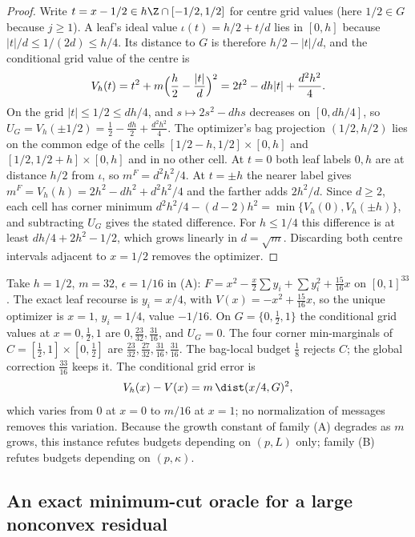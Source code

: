 \begin{proof}
Write $t=x-1/2\in h\Z\cap[-1/2,1/2]$ for centre grid values (here
$1/2\in G$ because $j\ge1$). A leaf's ideal value
$\iota(t)=h/2+t/d$ lies in $[0,h]$ because $|t|/d\le1/(2d)\le h/4$.
Its distance to $G$ is therefore $h/2-|t|/d$, and the conditional grid
value of the centre is
\[
V_h(t)=t^2+m\Bigl(\frac h2-\frac{|t|}d\Bigr)^2=2t^2-dh|t|+\frac{d^2h^2}4 .
\]
On the grid $|t|\le1/2\le dh/4$, and $s\mapsto2s^2-dhs$ decreases on
$[0,dh/4]$, so $U_G=V_h(\pm1/2)=\frac12-\frac{dh}2+\frac{d^2h^2}4$.
The optimizer's bag projection $(1/2,h/2)$ lies on the common edge of
the cells $[1/2-h,1/2]\times[0,h]$ and $[1/2,1/2+h]\times[0,h]$ and in no
other cell. At $t=0$ both leaf labels $0,h$ are at distance $h/2$ from
$\iota$, so $m^F=d^2h^2/4$. At $t=\pm h$ the nearer label gives
$m^F=V_h(h)=2h^2-dh^2+d^2h^2/4$ and the farther adds $2h^2/d$. Since
$d\ge2$, each cell has corner minimum $d^2h^2/4-(d-2)h^2
=\min\{V_h(0),V_h(\pm h)\}$, and subtracting $U_G$ gives the stated
difference. For $h\le1/4$ this difference is at least
$dh/4+2h^2-1/2$, which grows linearly in $d=\sqrt m$. Discarding both
centre intervals adjacent to $x=1/2$ removes the optimizer.
\end{proof}

\begin{example}\label{ex:cr-star32}
Take $h=1/2$, $m=32$, $\epsilon=1/16$ in (A):
$F=x^2-\frac x2\sum y_i+\sum y_i^2+\frac{15}{16}x$ on $[0,1]^{33}$.
The exact leaf recourse is $y_i=x/4$, with $V(x)=-x^2+\frac{15}{16}x$, so
the unique optimizer is $x=1$, $y_i=1/4$, value $-1/16$. On
$G=\{0,\frac12,1\}$ the conditional grid values at $x=0,\frac12,1$ are
$0,\frac{23}{32},\frac{31}{16}$, and $U_G=0$. The four corner
min-marginals of $C=[\frac12,1]\times[0,\frac12]$ are
$\frac{23}{32},\frac{27}{32},\frac{31}{16},\frac{31}{16}$. The bag-local
budget $\frac18$ rejects $C$; the global correction $\frac{33}{16}$ keeps it.
The conditional grid error is
\[
V_h(x)-V(x)=m\,\dist(x/4,G)^2,
\]
which varies from $0$ at $x=0$ to $m/16$ at $x=1$; no normalization of
messages removes this variation. Because the growth constant of family (A)
degrades as $m$ grows, this instance refutes budgets depending on
$(p,L)$ only; family (B) refutes budgets depending on $(p,\kappa)$.
\end{example}

\subsection{An exact minimum-cut oracle for a large nonconvex residual}\label{sec:cr-cut}

